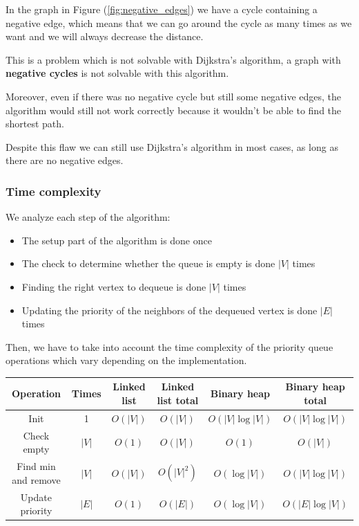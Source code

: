 \documentclass[10pt]{extarticle}
\begin{document}
In the graph in Figure (\ref{fig:negative_edges}) we have a cycle containing a negative edge, which means that we can go around the cycle as many times as we want and we will always decrease the distance.

This is a problem which is not solvable with Dijkstra's algorithm, a graph with \textbf{negative cycles} is not solvable with this algorithm.

Moreover, even if there was no negative cycle but still some negative edges, the algorithm would still not work correctly because it wouldn't be able to find the shortest path.

Despite this flaw we can still use Dijkstra's algorithm in most cases, as long as there are no negative edges.

\subsubsection{Time complexity}

We analyze each step of the algorithm:

\begin{itemize}
    \item The setup part of the algorithm is done once
    \item The check to determine whether the queue is empty is done $|V|$ times
    \item Finding the right vertex to dequeue is done $|V|$ times
    \item Updating the priority of the neighbors of the dequeued vertex is done $|E|$ times
\end{itemize}

Then, we have to take into account the time complexity of the priority queue operations which vary depending on the implementation.

\begin{center}
    \begin{tabular}{ |c|c|c|c|c|c| }
        \hline
        \textbf{Operation}  & \textbf{Times} & \textbf{Linked list} & \textbf{Linked list total} & \textbf{Binary heap} & \textbf{Binary heap total} \\
        \hline
        Init                & 1              & $O(|V|)$             & $O(|V|)$                   & $O(|V| \log |V|)$    & $O(|V| \log |V|)$          \\
        Check empty         & $|V|$          & $O(1)$               & $O(|V|)$                   & $O(1)$               & $O(|V|)$                   \\
        Find min and remove & $|V|$          & $O(|V|)$             & $O(|V|^2)$                 & $O(\log |V|)$        & $O(|V| \log |V|)$          \\
        Update priority     & $|E|$          & $O(1)$               & $O(|E|)$                   & $O(\log |V|)$        & $O(|E| \log |V|)$          \\
        \hline
    \end{tabular}
\end{center}
\end{document}
